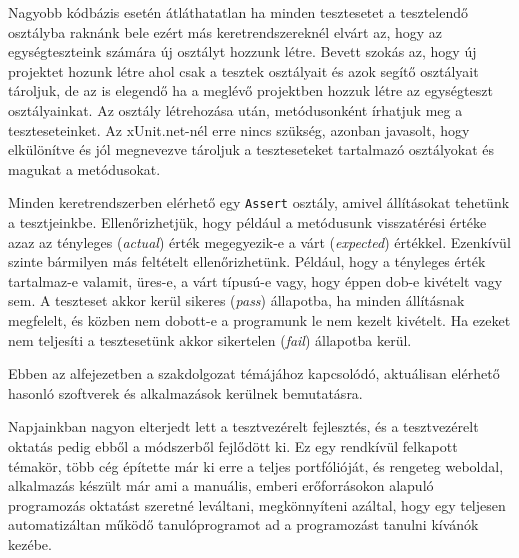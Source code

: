 Nagyobb kódbázis esetén átláthatatlan ha minden tesztesetet a tesztelendő osztályba raknánk bele ezért más keretrendszereknél elvárt az, hogy az egységteszteink számára új osztályt hozzunk létre. Bevett szokás az, hogy új projektet hozunk létre ahol csak a tesztek osztályait és azok segítő osztályait tároljuk, de az is elegendő ha a meglévő projektben hozzuk létre az egységteszt osztályainkat. Az osztály létrehozása után, metódusonként írhatjuk meg a teszteseteinket. Az xUnit.net-nél erre nincs szükség, azonban javasolt, hogy elkülönítve és jól megnevezve tároljuk a teszteseteket tartalmazó osztályokat és magukat a metódusokat.

Minden keretrendszerben elérhető egy \texttt{Assert} osztály, amivel állításokat tehetünk a tesztjeinkbe. Ellenőrizhetjük, hogy például a metódusunk visszatérési értéke azaz az tényleges (\emph{actual}) érték megegyezik-e a várt (\emph{expected}) értékkel. Ezenkívül szinte bármilyen más feltételt ellenőrizhetünk. Például, hogy a tényleges érték tartalmaz-e valamit, üres-e, a várt típusú-e vagy, hogy éppen dob-e kivételt vagy sem. A teszteset akkor kerül sikeres (\emph{pass}) állapotba, ha minden állításnak megfelelt, és közben nem dobott-e a programunk le nem kezelt kivételt. Ha ezeket nem teljesíti a tesztesetünk akkor sikertelen (\emph{fail}) állapotba kerül.



Ebben az alfejezetben a szakdolgozat témájához kapcsolódó, aktuálisan elérhető hasonló szoftverek és alkalmazások kerülnek bemutatásra.

Napjainkban nagyon elterjedt lett a tesztvezérelt fejlesztés, és a tesztvezérelt oktatás pedig ebből a módszerből fejlődött ki. Ez egy rendkívül felkapott témakör, több cég építette már ki erre a teljes portfólióját, és rengeteg weboldal, alkalmazás készült már ami a manuális, emberi erőforrásokon alapuló programozás oktatást szeretné leváltani, megkönnyíteni azáltal, hogy egy teljesen automatizáltan működő tanulóprogramot ad a programozást tanulni kívánók kezébe.


